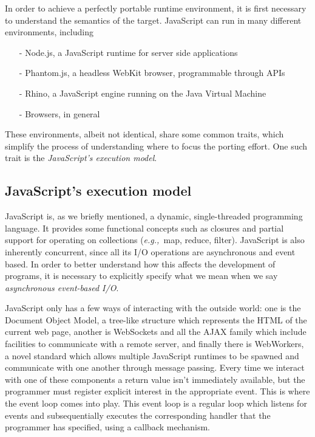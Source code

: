 \documentclass{sig-alternate}
\newcommand{\eg}{{\em e.g.,~}}
\begin{document}
In order to achieve a perfectly portable runtime environment, it is first necessary to understand the semantics of the target.
JavaScript can run in many different environments, including
\begin{itemize}
\item[-]{Node.js, a JavaScript runtime for server side applications}
\item[-]{Phantom.js, a headless WebKit browser, programmable through APIs}
\item[-]{Rhino, a JavaScript engine running on the Java Virtual Machine}
\item[-]{Browsers, in general}
\end{itemize}
These environments, albeit not identical, share some common traits, which simplify the process of understanding where to focus the porting effort. One such trait is the \textit{JavaScript's execution model}.

\subsection{JavaScript's execution model}

JavaScript is, as we briefly mentioned, a dynamic, single-threaded programming language. It provides some functional concepts such as closures and partial support for operating on collections (\eg map, reduce, filter).
JavaScript is also inherently concurrent, since all its I/O operations are asynchronous and event based.
In order to better understand how this affects the development of programs, it is necessary to explicitly specify what we mean when we say \textit{asynchronous event-based I/O}.

JavaScript only has a few ways of interacting with the outside world: one is the Document Object Model, a tree-like structure which represents the HTML of the current web page, another is WebSockets and all the AJAX family which include facilities to communicate with a remote server, and finally there is WebWorkers, a novel standard which allows multiple JavaScript runtimes to be spawned and communicate with one another through message passing.
Every time we interact with one of these components a return value isn't immediately available, but the programmer must register explicit interest in the appropriate event. This is where the event loop comes into play. This event loop is a regular loop which listens for events and subsequentially executes the corresponding handler that the programmer has specified, using a callback mechanism.
\end{document}
